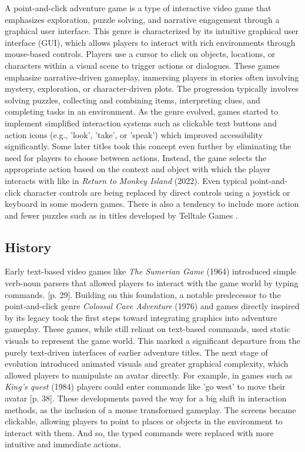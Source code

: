 A point-and-click adventure game is a type of interactive video game that emphasizes exploration, puzzle solving, and narrative engagement through a graphical user interface. This genre is characterized by its intuitive graphical user interface (GUI), which allows players to interact with rich environments through mouse-based controls. Players use a cursor to click on objects, locations, or characters within a visual scene to trigger actions or dialogues. These games emphasize narrative-driven gameplay, immersing players in stories often involving mystery, exploration, or character-driven plots. The progression typically involves solving puzzles, collecting and combining items, interpreting clues, and completing tasks in an environment. As the genre evolved, games started to implement simplified interaction systems such as clickable text buttons and action icons (e.g., 'look', 'take', or 'speak') which improved accessibility significantly. Some later titles took this concept even further by eliminating the need for players to choose between actions. Instead, the game selects the appropriate action based on the context and object with which the player interacts with like in \textit{Return to Monkey Island} (2022). Even typical point-and-click character controls are being replaced by direct controls using a joystick or keyboard in some modern games. There is also a tendency to include more action and fewer puzzles such as in titles developed by Telltale Games \cite{Carton2023history}. 


\subsection{History}
Early text-based video games like \textit{The Sumerian Game} (1964) introduced simple verb-noun parsers that allowed players to interact with the game world by typing commands. \cite{Salter2014}[p. 29]. Building on this foundation, a notable predecessor to the point-and-click genre \textit{Colossal Cave Adventure} (1976) and games directly inspired by its legacy took the first steps toward integrating graphics into adventure gameplay. These games, while still reliant on text-based commands, used static visuals to represent the game world. This marked a significant departure from the purely text-driven interfaces of earlier adventure titles. The next stage of evolution introduced animated visuals and greater graphical complexity, which allowed players to manipulate an avatar directly. For example, in games such as \textit{King's quest} (1984) players could enter commands like 'go west' to move their avatar \cite{Salter2014}[p. 38]. These developments paved the way for a big shift in interaction methods, as the inclusion of a mouse transformed gameplay. The screens became clickable, allowing players to point to places or objects in the environment to interact with them. And so, the typed commands were replaced with more intuitive and immediate actions.

